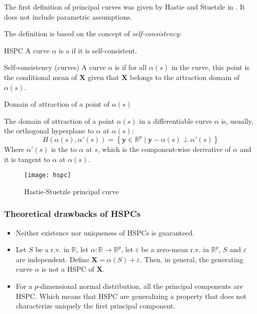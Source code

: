 The first definition of principal curves was given by Hastie and Stuetzle in \cite{hastie_principal_1989}.
It does not include parametric assumptions.

The definition is based on the concept of \emph{self-consistency}:
\begin{definition}{HSPC}{}
	A curve $\alpha$ is a  if it is self-consistent.
\end{definition}

\begin{definition}{Self-consistency (curves)}{}
	A curve $\alpha$ is  if for all $\alpha(s)$ in the curve,
	this point is the conditional mean of $\boldsymbol X$ given that $\boldsymbol X$ belongs
	to the attraction domain of $\alpha(s)$.
\end{definition}

\begin{definition}{Domain of attraction of a point of $\alpha(s)$}{}

	The domain of attraction of a point $\alpha(s)$ in a differentiable curve $\alpha$
	is, usually, the orthogonal hyperplane to $\alpha$ at $\alpha(s)$:
	\begin{equation*}
		H(\alpha(s), \alpha'(s)) = \left\{
		\boldsymbol{y} \in \mathds{R}^p \mid \boldsymbol{y} - \alpha(s) \perp \alpha'(s)
		\right\}
	\end{equation*}
	Where $\alpha'(s)$ is the  to $\alpha$ at $s$, which is
	the component-wise derivative of $\alpha$ and it is tangent to $\alpha$ at $\alpha(s)$.
\end{definition}

\begin{figure}[H]
	\texttt{[image: hspc]}
	\caption{Hastie-Stuetzle principal curve}
\end{figure}

\subsubsection{Theoretical drawbacks of HSPCs}

\begin{itemize}
	\item Neither existence nor uniqueness of HSPCs is guaranteed.
	\item Let $S$ be a r.v. in $\mathds{R}$, let $\alpha: \mathds{R} \to \mathds{R}^p$, let $\varepsilon$
	      be a zero-mean r.v. in $\mathds{R}^p$, $S$ and $\varepsilon$ are independent. Define
	      $\boldsymbol{X} = \alpha(S) + \varepsilon$. Then, in general, the
	      generating curve $\alpha$ is not a HSPC of $\boldsymbol{X}$.
	\item For a $p$-dimensional normal distribution, all the principal components are HSPC. Which
	      means that HSPC are generalizing a property that does not characterize uniquely the first
	      principal component.
\end{itemize}

